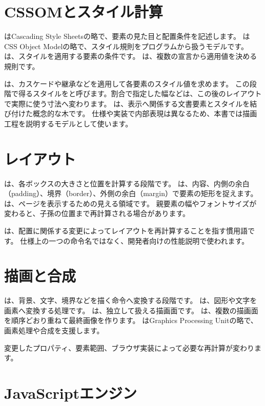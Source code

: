 \section{CSSOMとスタイル計算}

はCascading Style Sheetsの略で、要素の見た目と配置条件を記述します。
はCSS Object Modelの略で、スタイル規則をプログラムから扱うモデルです。
は、スタイルを適用する要素の条件です。
は、複数の宣言から適用値を決める規則です。

は、カスケードや継承などを適用して各要素のスタイル値を求めます。
この段階で得るスタイルをと呼びます。割合で指定した幅などは、この後のレイアウトで実際に使う寸法へ変わります。
は、表示へ関係する文書要素とスタイルを結び付けた概念的な木です。
仕様や実装で内部表現は異なるため、本書では描画工程を説明するモデルとして使います。

\section{レイアウト}

は、各ボックスの大きさと位置を計算する段階です。
は、内容、内側の余白（padding）、境界（border）、外側の余白（margin）で要素の矩形を捉えます。
は、ページを表示するための見える領域です。
親要素の幅やフォントサイズが変わると、子孫の位置まで再計算される場合があります。

は、配置に関係する変更によってレイアウトを再計算することを指す慣用語です。
仕様上の一つの命令名ではなく、開発者向けの性能説明で使われます。

\section{描画と合成}

は、背景、文字、境界などを描く命令へ変換する段階です。
は、図形や文字を画素へ変換する処理です。
は、独立して扱える描画面です。
は、複数の描画面を順序どおり重ねて最終画像を作ります。
はGraphics Processing Unitの略で、画素処理や合成を支援します。

変更したプロパティ、要素範囲、ブラウザ実装によって必要な再計算が変わります。

\section{JavaScriptエンジン}

